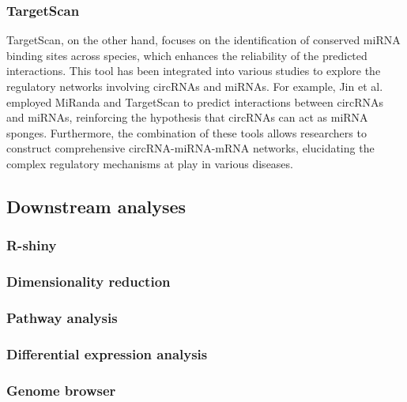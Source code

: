 \subsubsection{TargetScan}
TargetScan, on the other hand, focuses on the identification of conserved miRNA
binding sites across species, which enhances the reliability of the predicted
interactions. This tool has been integrated into various studies to explore the
regulatory networks involving circRNAs and miRNAs. For example, Jin et al.
employed MiRanda and TargetScan to predict interactions between circRNAs and
miRNAs, reinforcing the hypothesis that circRNAs can act as miRNA
sponges\supercite{jin_changes_2018}. Furthermore, the combination of these tools
allows researchers to construct comprehensive circRNA-miRNA-mRNA networks,
elucidating the complex regulatory mechanisms at play in various
diseases\supercite{he_construction_2021,zhang_construction_2021}.


\subsection{Downstream analyses}
\subsubsection{R-shiny}
\subsubsection{Dimensionality reduction}
\subsubsection{Pathway analysis}
\subsubsection{Differential expression analysis}
\subsubsection{Genome browser}
